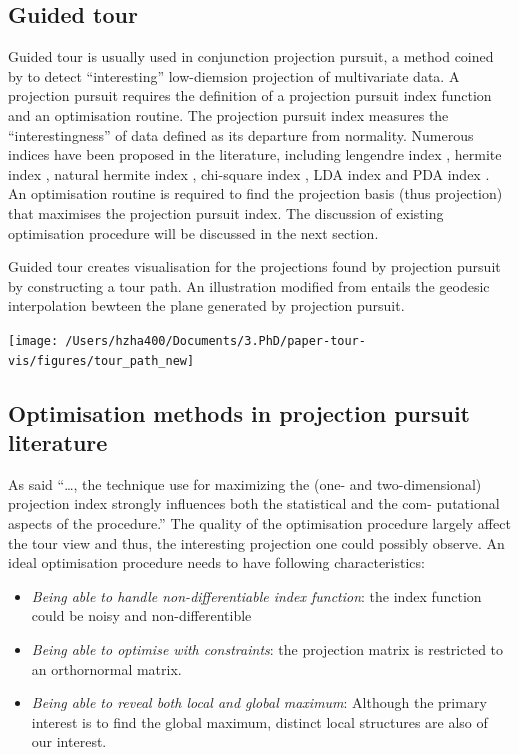 \documentclass[12pt]{article}
\begin{document}
\hypertarget{guided-tour}{%
\subsection{Guided tour}\label{guided-tour}}

Guided tour is usually used in conjunction projection pursuit, a method
coined by \citet{friedman1974projection} to detect ``interesting''
low-diemsion projection of multivariate data. A projection pursuit
requires the definition of a projection pursuit index function and an
optimisation routine. The projection pursuit index measures the
``interestingness'' of data defined as its departure from normality.
Numerous indices have been proposed in the literature, including
lengendre index \citep{friedman1974projection}, hermite index
\citep{hall1989polynomial}, natural hermite index
\citep{cook1993projection}, chi-square index
\citep{posse1995projection}, LDA index \citep{lee2005projection} and PDA
index \citep{lee2010projection}. An optimisation routine is required to
find the projection basis (thus projection) that maximises the
projection pursuit index. The discussion of existing optimisation
procedure will be discussed in the next section.

Guided tour creates visualisation for the projections found by
projection pursuit by constructing a tour path. An illustration modified
from \citep{buja2005computational} entails the geodesic interpolation
bewteen the plane generated by projection pursuit.

\texttt{[image: /Users/hzha400/Documents/3.PhD/paper-tour-vis/figures/tour\_path\_new]}

\hypertarget{optimisation-methods-in-projection-pursuit-literature}{%
\subsection{Optimisation methods in projection pursuit
literature}\label{optimisation-methods-in-projection-pursuit-literature}}

As \citet{friedman1974projection} said ``\ldots{}, the technique use for
maximizing the (one- and two-dimensional) projection index strongly
influences both the statistical and the com- putational aspects of the
procedure.'' The quality of the optimisation procedure largely affect
the tour view and thus, the interesting projection one could possibly
observe. An ideal optimisation procedure needs to have following
characteristics:

\begin{itemize}
\item
  \emph{Being able to handle non-differentiable index function}: the
  index function could be noisy and non-differentible
\item
  \emph{Being able to optimise with constraints}: the projection matrix
  is restricted to an orthornormal matrix.
\item
  \emph{Being able to reveal both local and global maximum}: Although
  the primary interest is to find the global maximum, distinct local
  structures are also of our interest.
\end{itemize}
\end{document}
